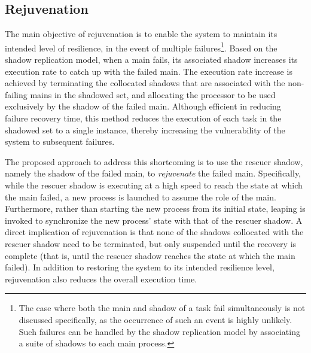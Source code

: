  

\subsection{Rejuvenation}

The main objective of rejuvenation is to enable the system to maintain its intended level of resilience, in the event of multiple failures\footnote{The case where both the main and shadow of a task fail simultaneously is not discussed specifically, as the occurrence of such an event is highly unlikely. Such failures can be handled by the shadow replication model by associating a suite of shadows to each main process.}. Based on the shadow replication model, when a main fails, its associated shadow increases its execution rate to catch up with the failed main. The execution rate increase is achieved by terminating  the collocated shadows that are associated with the non-failing mains in the shadowed set, and allocating the processor to be used exclusively by the shadow of the failed main. Although efficient in reducing failure recovery time, this method reduces the execution of each task in the shadowed set to a single instance, thereby increasing the vulnerability of the system to subsequent failures. 

The proposed approach to address this shortcoming is to use the rescuer shadow, namely the shadow of the failed main, to \textit{rejuvenate} the failed main.  Specifically, while the rescuer shadow is executing at a high speed to reach the state at which the main failed, a new process is launched to assume the role of the main. Furthermore, rather than starting the new process from its initial state, leaping is invoked to  synchronize the new process' state with that of the rescuer shadow. A direct implication of rejuvenation is that none of the shadows collocated with the rescuer shadow need to be terminated, but only suspended  until the recovery is complete (that is, until the rescuer shadow reaches the state at which the main failed).  In addition to restoring the system to its intended resilience level, rejuvenation also reduces the overall execution time. 



